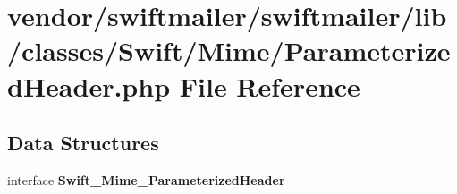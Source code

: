 \section{vendor/swiftmailer/swiftmailer/lib/classes/\+Swift/\+Mime/\+Parameterized\+Header.php File Reference}
\label{_parameterized_header_8php}
\subsection*{Data Structures}
\begin{DoxyCompactItemize}
\item 
interface {\bf Swift\+\_\+\+Mime\+\_\+\+Parameterized\+Header}
\end{DoxyCompactItemize}
